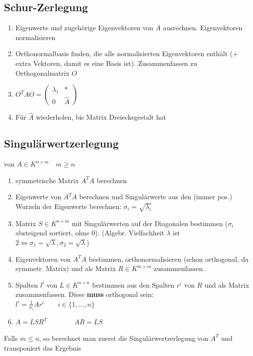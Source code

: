 \documentclass[german, fourcolumn, 8pt]{latex4ei/latex4ei_sheet}
\begin{document}
\begin{sectionbox}
    \subsection{Schur-Zerlegung}
    \begin{enumerate}
        \item Eigenwerte und zugehörige Eigenvektoren von $A$ ausrechnen. Eigenvektoren normalisieren
        \item Orthonormalbasis finden, die alle normalisierten Eigenvektoren enthält (+ extra Vektoren, damit es eine Basis ist). Zusammenfassen zu Orthogonalmatrix $O$
        \item $O^T A O=\begin{pmatrix}
                      \lambda_1 & * \\ 0 & \hat A
                  \end{pmatrix}$
        \item Für $\hat A$ wiederholen, bis Matrix Dreiecksgestalt hat
    \end{enumerate}

\end{sectionbox}
\begin{sectionbox}
    \subsection{Singulärwertzerlegung}
    von $A\in K^{n\times m} \quad m \ge n$
    \begin{enumerate}
        \item symmetrische Matrix $A^T A$ berechnen
        \item Eigenwerte von $A^TA$ berechnen und Singulärwerte aus den (immer pos.) Wurzeln der Eigenwerte berechnen: $\sigma_i = \sqrt{\lambda_i}$
        \item Matrix $S \in K^{n\times m}$ mit Singulärwerten auf der Diagonalen bestimmen ($\sigma_i$ absteigend sortiert, ohne $0$). (Algebr. Vielfachheit $\lambda$ ist $2 \Leftrightarrow \sigma_1=\sqrt \lambda, \sigma_2=\sqrt \lambda$)
        \item Eigenvektoren von $A^TA$ bestimmen, orthonormalisieren (schon orthogonal, da symmetr. Matrix) und als Matrix $R\in K^{m\times m}$ zusammenfassen.
        \item Spalten $l^i$ von $L \in K^{n\times n}$ bestimmen aus den Spalten $r^i$ von $R$ und als Matrix zusammenfassen. Diese \textbf{muss} orthogonal sein: \\
              $l^i=\frac{1}{\sigma_i}Ar^i \qquad i\in \{1,\dots,n\}$
        \item $A=LSR^T \qquad \qquad AR=LS$
    \end{enumerate}
    Falls $m \le n$, so berechnet man zuerst die Singulärwertzerlegung von $A^T$ und transponiert das Ergebnis
\end{sectionbox}
\end{document}
